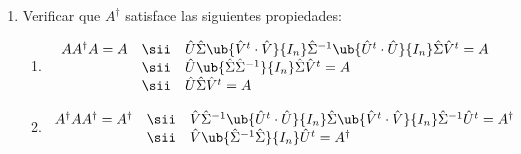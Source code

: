 \begin{enumerate}[label=(\alph*)]
  \item Verificar que $A^\dagger$ satisface las siguientes propiedades:
        \begin{enumerate}[label=\roman*.]
          \item
                $$
                  \begin{array}{rcl}
                    A A^\dagger A = A
                     & \sii &
                    \hat{U}\hat{\Sigma}
                    \ub{
                      \hat{V}^t \cdot \hat{V}
                    }{
                      I_n
                    }
                    \hat{\Sigma}^{-1}
                    \ub{
                      \hat{U}^t \cdot \hat{U}
                    }{
                      I_n
                    }
                    \hat{\Sigma}\hat{V}^t
                    =
                    A         \\
                     & \sii &
                    \hat{U}
                    \ub{
                      \hat{\Sigma}
                      \hat{\Sigma}^{-1}
                    }{
                      I_n
                    }
                    \hat{\Sigma}\hat{V}^t
                    =
                    A         \\
                     & \sii &
                    \hat{U}
                    \hat{\Sigma}
                    \hat{V}^t
                    =
                    A
                  \end{array}
                $$

          \item
                $$
                  \begin{array}{rcl}
                    A^\dagger A A^\dagger = A^\dagger
                     & \sii &
                    \hat{V} \hat{\Sigma}^{-1}
                    \ub{
                      \hat{U}^t \cdot \hat{U}
                    }{
                      I_n
                    }
                    \hat{\Sigma}
                    \ub{
                      \hat{V}^t \cdot \hat{V}
                    }{
                      I_n
                    }
                    \hat{\Sigma}^{-1} \hat{U}^t
                    = A^\dagger \\
                     & \sii &
                    \hat{V}
                    \ub{
                      \hat{\Sigma}^{-1}
                      \hat{\Sigma}
                    }{
                      I_n
                    }
                    \hat{U}^t
                    = A^\dagger
                  \end{array}
                $$


\end{enumerate}
\end{enumerate}
